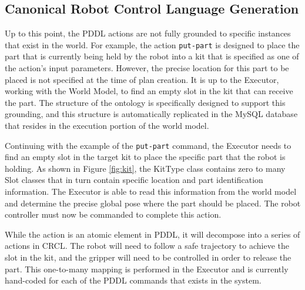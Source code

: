 \subsection{Canonical Robot Control Language Generation}
Up to this point, the PDDL actions are not fully grounded to specific instances
that exist in the world. For example, the action \texttt{put-part} is designed
to place the part that is currently being held by the robot into a kit that
is specified as one of the action's input parameters. However, the precise
location for this part to be placed is not specified at the time of plan
creation. It is up to the Executor, working with the World Model, to find
an empty slot in the kit that can receive the part. The structure of the
ontology is specifically designed to support this grounding, and this
structure is automatically replicated in the MySQL database that resides
in the execution portion of the world model. 

Continuing with
the example of the \texttt{put-part} command, the Executor needs to find
an empty slot in the target kit to place the specific part that the robot is
holding. As shown in Figure \ref{fig:kit}, the {\sc KitType} class contains
zero to many {\sc Slot} classes that in turn contain specific location and 
part identification information. The Executor is able to read this information
from the world model and determine the precise global pose where the part
should be placed. The robot controller must now be commanded to complete this action.

While the action is an atomic element in PDDL, it will decompose into a series
of actions in CRCL. The robot will need to follow a safe trajectory to achieve
the slot in the kit, and the gripper will need to be controlled in order to release
the part. This one-to-many mapping is performed in the Executor and is currently
hand-coded for each of the PDDL commands that exists in the system. 
%
